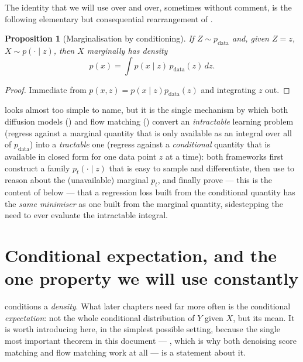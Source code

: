 \documentclass[11pt,a4paper]{report}
\newtheorem{proposition}[proposition]{Proposition}
\theoremstyle{definition}
\theoremstyle{remark}
\begin{document}
The identity that we will use over and over, sometimes without comment, is
the following elementary but consequential rearrangement of
.

\begin{proposition}[Marginalisation by conditioning]
\label{prop:marginalisation}
If $Z\sim p_{\mathrm{data}}$ and, given $Z=z$, $X\sim p(\cdot\mid z)$, then $X$
marginally has density
\[
p(x) = \int p(x\mid z)\,p_{\mathrm{data}}(z)\,dz .
\]
\end{proposition}

\begin{proof}
Immediate from $p(x,z)=p(x\mid z)p_{\mathrm{data}}(z)$ and integrating $z$ out.
\end{proof}

 looks almost too simple to name, but it is the
single mechanism by which both diffusion models
() and flow matching ()
convert an \emph{intractable} learning problem (regress against a marginal
quantity that is only available as an integral over all of
$p_{\mathrm{data}}$) into a \emph{tractable} one (regress against a
\emph{conditional} quantity that is available in closed form for one data
point $z$ at a time): both frameworks first construct a family
$p_t(\cdot\mid z)$ that is easy to sample and differentiate, then use
 to reason about the (unavailable) marginal
$p_t$, and finally prove --- this is the content of
 below --- that a regression
loss built from the conditional quantity has the \emph{same minimiser} as
one built from the marginal quantity, sidestepping the need to ever
evaluate the intractable integral.

\section{Conditional expectation, and the one property we will use constantly}
\label{sec:conditional-expectation}

 conditions a \emph{density}. What later
chapters need far more often is the conditional \emph{expectation}: not the
whole conditional distribution of $Y$ given $X$, but its mean. It is worth
introducing here, in the simplest possible setting, because the single most
important theorem in this document --- , which is
why both denoising score matching and flow matching work at all --- is a
statement about it.
\end{document}
